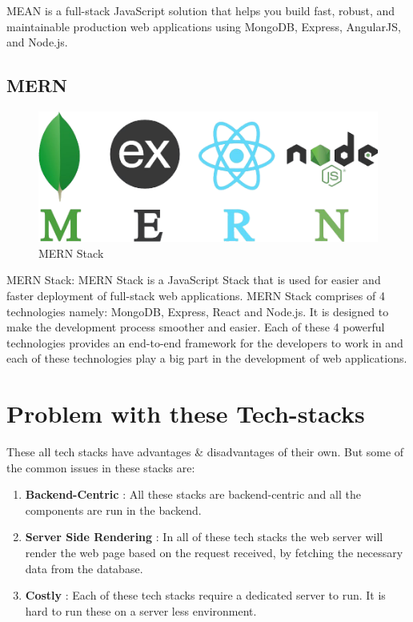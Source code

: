 \documentclass[12pt,a4paper,oneside]{report}
\begin{document}
\par 
MEAN is a full-stack JavaScript solution that helps you build fast, robust, and maintainable production web applications using MongoDB, Express, AngularJS, and Node.js.\cite{mean}

\subsection{MERN}

\begin{figure}[H]
    \centering
    \includegraphics[scale=.25]{images/mern.png}
    \caption{MERN Stack\cite{mern}}
\end{figure}

\par 
MERN Stack: MERN Stack is a JavaScript Stack that is used for easier and faster deployment of full-stack web applications. MERN Stack comprises of 4 technologies namely: MongoDB, Express, React and Node.js. It is designed to make the development process smoother and easier.
Each of these 4 powerful technologies provides an end-to-end framework for the developers to work in and each of these technologies play a big part in the development of web applications\cite{mern}.

\section{Problem with these Tech-stacks}

\pre 
These all tech stacks have advantages \& disadvantages of their own. But some of the common issues in these stacks are:
\begin{enumerate}
\item \textbf{Backend-Centric} : All these stacks are backend-centric and all the components are run in the backend.
\item \textbf{Server Side Rendering} : In all of these tech stacks the web server will render the web page based on the request received, by fetching the necessary data from the database.
\item \textbf{Costly} : Each of these tech stacks require a dedicated server to run. It is hard to run these on a server less environment.
\end{enumerate}
\end{document}
